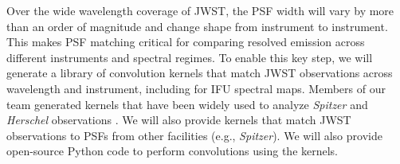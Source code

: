 \documentclass[12pt]{article}
\begin{document}
\vspace{0.05in} 

  Over the wide wavelength coverage of JWST, the PSF width will vary by more than an order of magnitude and change shape from instrument to instrument. This makes PSF matching critical for comparing resolved emission across different instruments and spectral regimes. To enable this key step, we will generate a library of convolution kernels that match JWST observations across wavelength and instrument, including for IFU spectral maps.  Members of our team generated kernels that have been widely used to analyze {\em Spitzer} and {\em Herschel} observations \citep{gordon2008,sandstrom2009,aniano2011}. We will also provide kernels that match JWST observations to PSFs from other facilities (e.g., {\em Spitzer}).  We will also provide open-source Python code to perform convolutions using the kernels.

\vspace{0.05in} 


\end{document}
